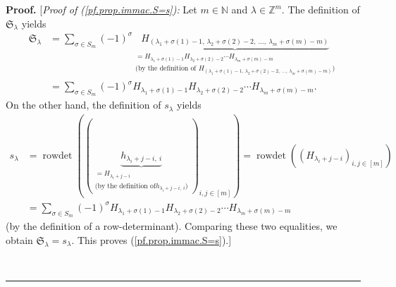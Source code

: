 \documentclass
[numbers=enddot,12pt,final,onecolumn,notitlepage,english]{scrartcl}%
\theoremstyle{definition}
\newenvironment{proof}[1][Proof]{\noindent\textbf{#1.} }{\ \rule{0.5em}{0.5em}}
\let\sumnonlimits\sum
\renewcommand{\sum}{\sumnonlimits\limits}
\newenvironment{verlong}{}{}
\begin{document}
\begin{proof}
\begin{verlong}
[\textit{Proof of (\ref{pf.prop.immac.S=s}):} Let $m\in\mathbb{N}$ and
$\lambda\in\mathbb{Z}^{m}$. The definition of $\mathfrak{S}_{\lambda}$ yields%
\begin{align*}
\mathfrak{S}_{\lambda}  &  =\sum_{\sigma\in S_{m}}\left(  -1\right)  ^{\sigma
}\underbrace{H_{\left(  \lambda_{1}+\sigma\left(  1\right)  -1,\ \lambda
_{2}+\sigma\left(  2\right)  -2,\ \ldots,\ \lambda_{m}+\sigma\left(  m\right)
-m\right)  }}_{\substack{=H_{\lambda_{1}+\sigma\left(  1\right)  -1}%
H_{\lambda_{2}+\sigma\left(  2\right)  -2}\cdots H_{\lambda_{m}+\sigma\left(
m\right)  -m}\\\text{(by the definition of }H_{\left(  \lambda_{1}%
+\sigma\left(  1\right)  -1,\ \lambda_{2}+\sigma\left(  2\right)
-2,\ \ldots,\ \lambda_{m}+\sigma\left(  m\right)  -m\right)  }\text{)}}}\\
&  =\sum_{\sigma\in S_{m}}\left(  -1\right)  ^{\sigma}H_{\lambda_{1}%
+\sigma\left(  1\right)  -1}H_{\lambda_{2}+\sigma\left(  2\right)  -2}\cdots
H_{\lambda_{m}+\sigma\left(  m\right)  -m}.
\end{align*}
On the other hand, the definition of $s_{\lambda}$ yields%
\begin{align*}
s_{\lambda}  &  =\operatorname*{rowdet}\left(  \left(  \underbrace{h_{\lambda
_{i}+j-i,\ i}}_{\substack{=H_{\lambda_{i}+j-i}\\\text{(by the definition of
}h_{\lambda_{i}+j-i,\ i}\text{)}}}\right)  _{i,j\in\left[  m\right]  }\right)
=\operatorname*{rowdet}\left(  \left(  H_{\lambda_{i}+j-i}\right)
_{i,j\in\left[  m\right]  }\right) \\
&  =\sum_{\sigma\in S_{m}}\left(  -1\right)  ^{\sigma}H_{\lambda_{1}%
+\sigma\left(  1\right)  -1}H_{\lambda_{2}+\sigma\left(  2\right)  -2}\cdots
H_{\lambda_{m}+\sigma\left(  m\right)  -m}%
\end{align*}
(by the definition of a row-determinant). Comparing these two equalities, we
obtain $\mathfrak{S}_{\lambda}=s_{\lambda}$. This proves
(\ref{pf.prop.immac.S=s}).] \medskip
\end{verlong}


\end{proof}
\end{document}
